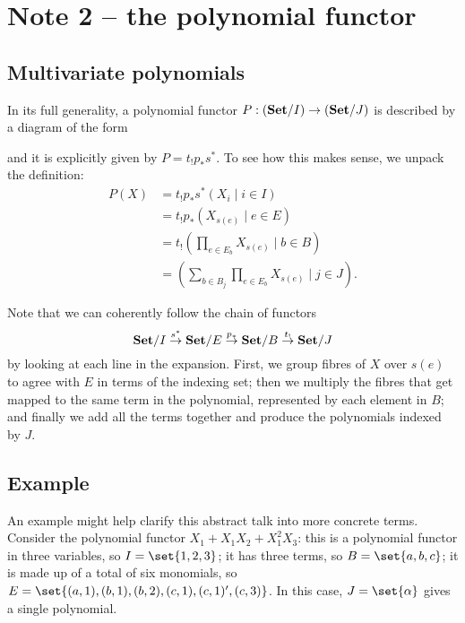 
\section{Note 2 -- the polynomial functor}

\subsection{Multivariate polynomials}

In its full generality, a polynomial functor $P:(\mathbf{Set}/I)\to(\mathbf{Set}/J)$ is described by a diagram of the form
\begin{center}
\end{center}

and it is explicitly given by $P=t_!p_*s^*$. To see how this makes sense, we unpack the definition:
\begin{align*}
  P(X) &= t_!p_*s^*\left( X_i \mid i\in I \right)\\
    &= t_!p_*\left( X_{s(e)} \mid e\in E \right)\\
    &= t_!\left( \prod_{e\in E_b} X_{s(e)} \mid b\in B \right)\\
    &= \left( \sum_{b\in B_j}\prod_{e\in E_b} X_{s(e)} \mid j\in J \right).
\end{align*}

Note that we can coherently follow the chain of functors
\[
  \mathbf{Set}/I \overset{s^*}{\rightarrow} \mathbf{Set}/E \overset{p_*}{\rightarrow} \mathbf{Set}/B \overset{t_!}{\rightarrow} \mathbf{Set}/J
\]
by looking at each line in the expansion. First, we group fibres of $X$ over $s(e)$ to agree with $E$ in terms of the indexing set; then we multiply the fibres that get mapped to the same term in the polynomial, represented by each element in $B$; and finally we add all the terms together and produce the polynomials indexed by $J$.

\subsection{Example}

An example might help clarify this abstract talk into more concrete terms. Consider the polynomial functor $X_1+X_1X_2 + X_1^2X_3$: this is a polynomial functor in three variables, so $I=\set{1,2,3}$; it has three terms, so $B=\set{a,b,c}$; it is made up of a total of six monomials, so $E=\set{(a,1), (b,1), (b,2), (c,1), (c,1)', (c,3)}$. In this case, $J=\set{\alpha}$ gives a single polynomial.

